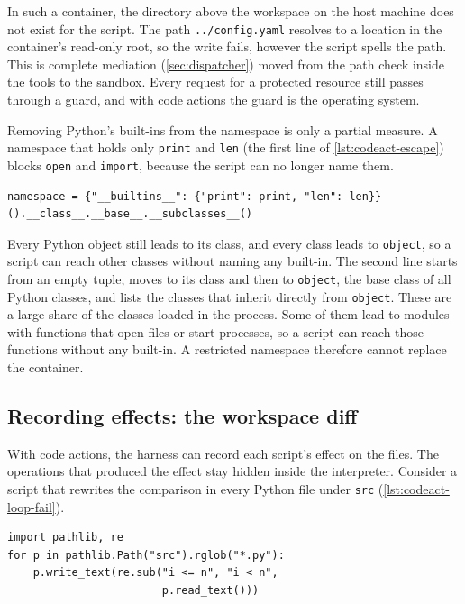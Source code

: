In such a container, the directory above the workspace on the host machine does not exist for the
script. The path \texttt{../config.yaml} resolves to a location in the container's read-only root,
so the write fails, however the script spells the path. This is complete mediation
(\cref{sec:dispatcher}) moved from the path check inside the tools to the sandbox. Every request for a protected
resource still passes through a guard, and with code actions the guard is the operating system.

Removing Python's built-ins from the namespace is only a partial measure. A namespace that holds
only \texttt{print} and \texttt{len} (the first line of \cref{lst:codeact-escape}) blocks
\texttt{open} and \texttt{import}, because the script can no longer name them.

\begin{lstlisting}[basicstyle=\ttfamily\footnotesize, columns=fixed, basewidth=0.525em, caption={Illustrative namespace without built-ins (first line) and a known way around it that needs no built-in (second line).}, label=lst:codeact-escape]
namespace = {"__builtins__": {"print": print, "len": len}}
().__class__.__base__.__subclasses__()
\end{lstlisting}

Every Python object still leads to its class, and every class leads to \texttt{object}, so a script
can reach other classes without naming any built-in. The second line starts from an empty
tuple, moves to its class and then to \texttt{object}, the base class of all Python classes, and
lists the classes that inherit directly from \texttt{object}. These are a large share of the
classes loaded in the process. Some of them lead to modules with functions that open files or
start processes, so a script can reach those functions without any built-in. A restricted
namespace therefore cannot replace the container.

\subsection{Recording effects: the workspace diff}
\label{sec:codeact-diff}

With code actions, the harness can record each script's effect on the files. The operations that
produced the effect stay hidden inside the interpreter. Consider a script that rewrites the
comparison in every Python file under \texttt{src} (\cref{lst:codeact-loop-fail}).

\begin{lstlisting}[basicstyle=\ttfamily\footnotesize, columns=fixed, basewidth=0.525em, caption={Illustrative script whose loop fails partway.}, label=lst:codeact-loop-fail]
import pathlib, re
for p in pathlib.Path("src").rglob("*.py"):
    p.write_text(re.sub("i <= n", "i < n",
                        p.read_text()))
\end{lstlisting}

